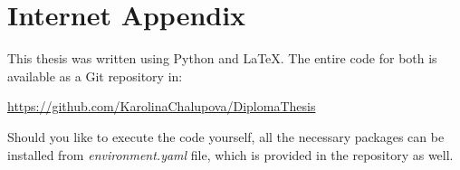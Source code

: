 \chapter{Internet Appendix}

This thesis was written using Python and LaTeX. The entire code for both is available as a Git repository in:   

\url{https://github.com/KarolinaChalupova/DiplomaThesis} 
 

Should you like to execute the code yourself, all the necessary packages can be installed from \textit{environment.yaml} file, which is provided in the repository as well.    


